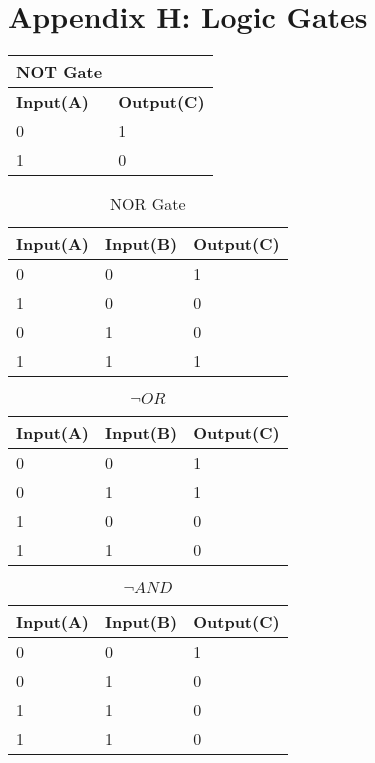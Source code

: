 \section*{Appendix H: Logic Gates}


\begin{table}
\begin{center}
\begin{tabularx}{150pt}{|X|X|}
\textbf{NOT Gate} \\ \hline
\textbf{Input(A)} & \textbf{Output(C)} \\ \hline
0 & 1 \\ \hline
1 & 0 \\ \hline
\end{tabularx}
\end{center}
\label{tb:not}
\end{table}


\begin{table}
\begin{center}
\begin{tabularx}{150pt}{|X|X|X|}
\textbf{Input(A)} & \textbf{Input(B)} & \textbf{Output(C)} \\ \hline
0 & 0 & 1 \\ \hline
1 & 0 & 0 \\ \hline
0 & 1 & 0 \\ \hline
1 & 1 & 1 \\ \hline
\end{tabularx}
\caption{NOR Gate}
\label{tb:nor}
\end{center}
\label{tb:nor}
\end{table}

\begin{table}
\begin{center}
\begin{tabularx}{150pt}{|X|X|X|}
\textbf{Input(A)} & \textbf{Input(B)} & \textbf{Output(C)} \\ \hline
0 & 0 & 1 \\ \hline
0 & 1 & 1 \\ \hline
1 & 0 & 0 \\ \hline
1 & 1 & 0 \\ \hline
\end{tabularx}
\caption{$\neg OR$}
\label{tb:ntor}
\end{center}
\end{table}


\begin{table}
\begin{center}
\begin{tabularx}{150pt}{|X|X|X|}
\textbf{Input(A)} & \textbf{Input(B)} & \textbf{Output(C)} \\ \hline
0 & 0 & 1 \\ \hline
0 & 1 & 0 \\ \hline
1 & 1 & 0 \\ \hline
1 & 1 & 0 \\ \hline
\end{tabularx}
\caption{$\neg AND$}
\label{tb:ntand}
\end{center}
\end{table}

